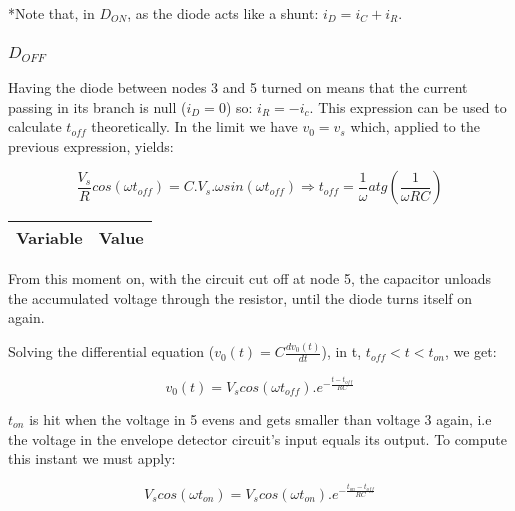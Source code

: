*Note that, in $D_{ON}$, as the diode acts like a shunt: $i_D = i_C + i_R$.

\subsubsection{$D_{OFF}$}

Having the diode between nodes 3 and 5 turned on means that the current passing in its branch is null ($i_D = 0 $) so: $i_R = -i_c$. This expression can be used to calculate $t_{off}$ theoretically. In the limit we have $v_0 = v_s$ which, applied to the previous expression, yields:


\begin{center}
\begin{equation}
	\frac{V_{s}}{R} cos(\omega t_{off}) = C.V_s.\omega sin(\omega t_{off}) \Rightarrow t_{off} = \frac{1}{\omega} atg(\frac{1}{\omega RC})
\end{equation}
\end{center}

\begin{tabular}{|l|r|}
  \hline    
  {\bf Variable} & {\bf Value} \\ \hline %
  
\end{tabular}

From this moment on, with the circuit cut off at node 5, the capacitor unloads the accumulated voltage through the resistor, until the diode turns itself on again.\par

Solving the differential equation ($v_0(t) = C\frac{dv_0(t)}{dt}$), in t, $t_{off} < t < t_{on}$, we get:

\begin{center}
\begin{equation}
	v_0(t) = V_s cos(\omega t_{off}).e^{-\frac{ t-t_{off} }{RC}}
\end{equation}
\end{center}


$t_{on}$ is hit when the voltage in 5 evens and gets smaller than voltage 3 again, i.e the voltage in the envelope detector circuit's input equals its output. To compute this instant we must apply:

\begin{center}
\begin{equation}
	 V_s cos(\omega t_{on}) = V_s cos(\omega t_{on}).e^{-\frac{ t_{on}-t_{off} }{RC}}
\end{equation}
\end{center}


